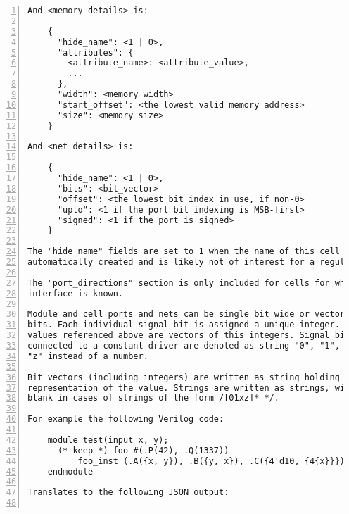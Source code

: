 \begin{lstlisting}[numbers=left,frame=single]
And <memory_details> is:

    {
      "hide_name": <1 | 0>,
      "attributes": {
        <attribute_name>: <attribute_value>,
        ...
      },
      "width": <memory width>
      "start_offset": <the lowest valid memory address>
      "size": <memory size>
    }

And <net_details> is:

    {
      "hide_name": <1 | 0>,
      "bits": <bit_vector>
      "offset": <the lowest bit index in use, if non-0>
      "upto": <1 if the port bit indexing is MSB-first>
      "signed": <1 if the port is signed>
    }

The "hide_name" fields are set to 1 when the name of this cell or net is
automatically created and is likely not of interest for a regular user.

The "port_directions" section is only included for cells for which the
interface is known.

Module and cell ports and nets can be single bit wide or vectors of multiple
bits. Each individual signal bit is assigned a unique integer. The <bit_vector>
values referenced above are vectors of this integers. Signal bits that are
connected to a constant driver are denoted as string "0", "1", "x", or
"z" instead of a number.

Bit vectors (including integers) are written as string holding the binary
representation of the value. Strings are written as strings, with an appended
blank in cases of strings of the form /[01xz]* */.

For example the following Verilog code:

    module test(input x, y);
      (* keep *) foo #(.P(42), .Q(1337))
          foo_inst (.A({x, y}), .B({y, x}), .C({4'd10, {4{x}}}));
    endmodule

Translates to the following JSON output:


\end{lstlisting}
